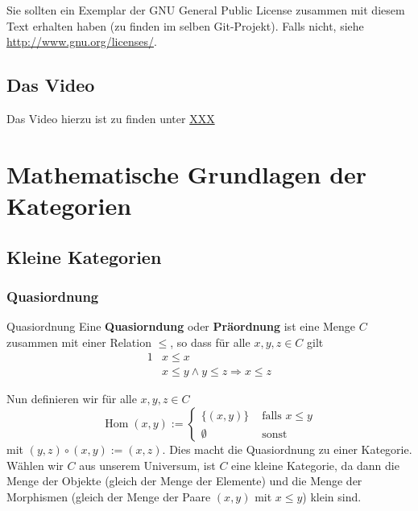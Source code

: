 \documentclass[a4paper]{amsart}
\theoremstyle{definition}
\DeclareMathOperator{\Hom}{Hom}
\begin{document}
Sie sollten ein Exemplar der GNU General Public License zusammen mit diesem Text erhalten haben
(zu finden im selben Git-Projekt).
Falls nicht, siehe \url{http://www.gnu.org/licenses/}.

\subsection*{Das Video}
Das Video hierzu ist zu finden unter
{\tiny
   \url{XXX}
}

\section{Mathematische Grundlagen der Kategorien}

\subsection{Kleine Kategorien}

\subsubsection{Quasiordnung}
\begin{Definition}{Quasiordnung}
   Eine \textbf{Quasiorndung} oder \textbf{Präordnung} ist eine Menge $C$ zusammen mit einer Relation $\le$, so dass für alle $x, y, z \in C$ gilt
   \begin{alignat}{1}
      &x \le x\\
      &x \le y \land y \le z \Rightarrow x \le z
   \end{alignat}
\end{Definition}

Nun definieren wir für alle $x, y, z \in C$
\begin{equation}
   \Hom(x,y) := \begin{cases}
      \{ (x,y) \} & \text{ falls } x \le y\\
      \emptyset & \text{ sonst }
   \end{cases}
\end{equation}
mit $(y,z) \circ (x,y) := (x,z)$. Dies macht die Quasiordnung zu einer Kategorie. Wählen wir $C$ aus unserem Universum, ist $C$ eine kleine Kategorie, da dann die Menge der Objekte (gleich der Menge der Elemente) und die Menge der Morphismen (gleich der Menge der Paare $(x,y)$ mit $x \le y$) klein sind.
\end{document}
